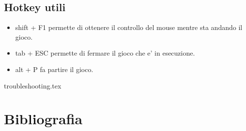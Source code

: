 \documentclass{book}
\begin{document}
    \section{Hotkey utili}

        \begin{itemize}
            \item shift + F1 permette di ottenere il controllo del mouse mentre sta andando il gioco.
            \item tab + ESC permette di fermare il gioco che e' in esecuzione.
            \item alt + P fa partire il gioco.
        \end{itemize}


    {troubleshooting.tex}


    \chapter{Bibliografia}
    \nocite{*}
    \printbibliography[heading=none]
\end{document}

